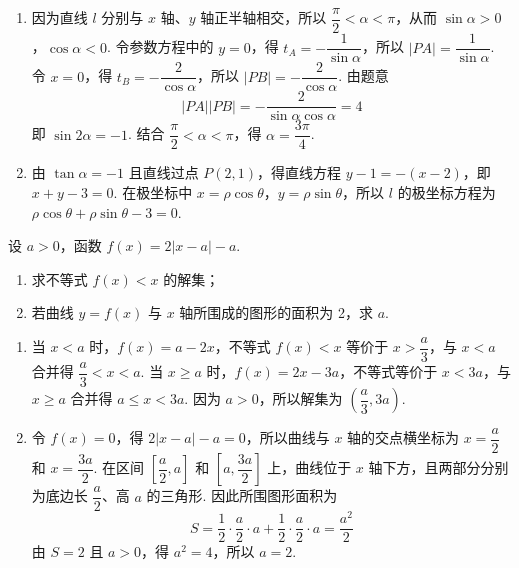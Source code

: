 \begin{solution}
\begin{enumerate}
\item 因为直线 \(l\) 分别与 \(x\) 轴、\(y\) 轴正半轴相交，所以
\(\dfrac\pi2<\alpha<\pi\)，从而 \(\sin\alpha>0\)，\(\cos\alpha<0\). 令参数方程中的 \(y=0\)，得
\(t_A=-\dfrac1{\sin\alpha}\)，所以 \(\lvert PA\rvert=\dfrac1{\sin\alpha}\). 令 \(x=0\)，得
\(t_B=-\dfrac2{\cos\alpha}\)，所以 \(\lvert PB\rvert=-\dfrac2{\cos\alpha}\). 由题意
\[
\lvert PA\rvert\lvert PB\rvert
=-\frac{2}{\sin\alpha\cos\alpha}=4
\]
即 \(\sin2\alpha=-1\). 结合 \(\dfrac\pi2<\alpha<\pi\)，得 \(\alpha=\dfrac{3\pi}{4}\).
\item 由 \(\tan\alpha=-1\) 且直线过点 \(P(2,1)\)，得直线方程
\(y-1=-(x-2)\)，即 \(x+y-3=0\). 在极坐标中 \(x=\rho\cos\theta\)，\(y=\rho\sin\theta\)，所以 \(l\) 的极坐标方程为
\(\rho\cos\theta+\rho\sin\theta-3=0\).
\end{enumerate}
\end{solution}

\begin{problem}
设 \( a>0 \)，函数 \( f(x)=2\lvert x-a \rvert-a \).

\begin{enumerate}
\item 求不等式 \( f(x)<x \) 的解集；
\item 若曲线 \( y=f(x) \) 与 \( x \) 轴所围成的图形的面积为 2，求 \( a \).
\end{enumerate}
\end{problem}

\begin{solution}
\begin{enumerate}
\item 当 \(x<a\) 时，\(f(x)=a-2x\)，不等式 \(f(x)<x\) 等价于 \(x>\dfrac a3\)，与 \(x<a\) 合并得
\(\dfrac a3<x<a\). 当 \(x\geq a\) 时，\(f(x)=2x-3a\)，不等式等价于 \(x<3a\)，与 \(x\geq a\) 合并得
\(a\leq x<3a\). 因为 \(a>0\)，所以解集为 \(\left(\dfrac a3,3a\right)\).
\item 令 \(f(x)=0\)，得 \(2\lvert x-a\rvert-a=0\)，所以曲线与 \(x\) 轴的交点横坐标为
\(x=\dfrac a2\) 和 \(x=\dfrac{3a}{2}\). 在区间 \(\left[\dfrac a2,a\right]\) 和 \(\left[a,\dfrac{3a}{2}\right]\) 上，曲线位于 \(x\) 轴下方，且两部分分别为底边长 \(\dfrac a2\)、高 \(a\) 的三角形. 因此所围图形面积为
\[
S=\frac12\cdot\frac a2\cdot a+\frac12\cdot\frac a2\cdot a=\frac{a^2}{2}
\]
由 \(S=2\) 且 \(a>0\)，得 \(a^2=4\)，所以 \(a=2\).
\end{enumerate}
\end{solution}
